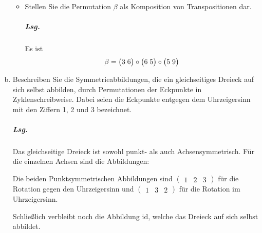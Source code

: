 \documentclass{scrreprt}
\begin{document}
\begin{enumerate}[(a)]
\begin{itemize}
  \newpage
  \item Stellen Sie die Permutation $\beta$ als Komposition von Transpositionen
    dar.

    \subparagraph{Lsg.} Es ist
    \[
      \beta = \qty\big(3\;6) \circ \qty\big(6\;5) \circ \qty\big(5\;9)
    \]
  \end{itemize}

\item Beschreiben Sie die Symmetrieabbildungen, die ein gleichseitiges Dreieck
  auf sich selbst abbilden, durch Permutationen der Eckpunkte in
  Zyklenschreibweise.
  Dabei seien die Eckpunkte entgegen dem Uhrzeigersinn mit den Ziffern 1, 2 und
  3 bezeichnet.

  \subparagraph{Lsg.} Das gleichseitige Dreieck ist sowohl punkt- als auch
  Achsensymmetrisch.
  Für die einzelnen Achsen sind die Abbildungen:


  Die beiden Punktsymmetrischen Abbildungen sind
  $\begin{pmatrix} 1 & 2 & 3 \end{pmatrix}$ für die Rotation gegen den
  Uhrzeigersinn und
  $\begin{pmatrix} 1 & 3 & 2 \end{pmatrix}$ für die Rotation im Uhrzeigersinn.

  Schließlich verbleibt noch die Abbildung $\text{id}$, welche das Dreieck auf
  sich selbst abbildet.
\end{enumerate}
\end{document}
